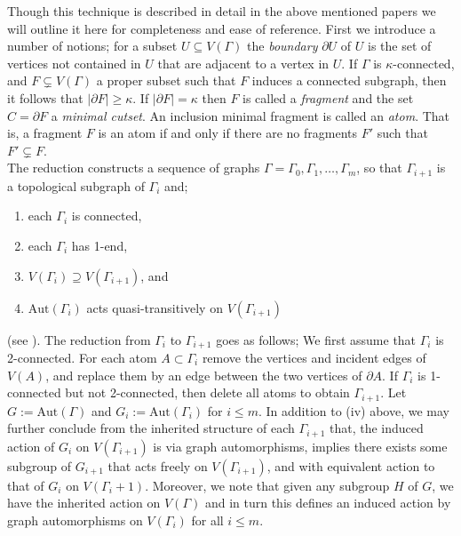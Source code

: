 \documentclass{article}
\numberwithin{equation}{section}
\theoremstyle{definition}
\theoremstyle{remark}
\begin{document}
Though this technique is described in detail in the above mentioned papers we will outline it here for completeness and ease of reference.
First we introduce a number of notions; for a subset $U\subseteq V(\Gamma)$ the \textit{boundary} $\partial U$ of $U$ is the set of vertices not contained in $U$ that are adjacent to a vertex in $U$. If $\Gamma$ is $\kappa$-connected, and $F\subsetneq V(\Gamma)$ a proper subset such that $F$ induces a connected subgraph, then it follows that $|\partial F|\geq \kappa$. If $|\partial F|=\kappa$ then $F$ is called a \textit{fragment} and the set $C=\partial F$ a \textit{minimal cutset}. An inclusion minimal fragment is called an \textit{atom}. That is, a fragment $F$ is an atom if and only if there are no fragments $F'$ such that $F'\subsetneq F.$ 
\\ 
The reduction constructs a sequence of graphs $\Gamma=\Gamma_0,\Gamma_1,\ldots, \Gamma_m$, so that $\Gamma_{i+1}$ is a topological subgraph of $\Gamma_i$ and; 
\begin{enumerate}
    \item each $\Gamma_i$ is connected,
    \item each $\Gamma_i$ has 1-end,
    \item $V(\Gamma_i)\supseteq V(\Gamma_{i+1})$, and
    \item $\text{Aut}(\Gamma_i)$ acts quasi-transitively on $V(\Gamma_{i+1})$
\end{enumerate}
(see \cite[Theorem 4.1]{Babai97}). The reduction from $\Gamma_i$ to $\Gamma_{i+1}$ goes as follows; We first assume that $\Gamma_i$ is 2-connected.
For each atom $A\subset \Gamma_i$ remove the vertices and incident edges of $V(A)$, and replace them by an edge between the two vertices of $\partial A$. If $\Gamma_i$ is 1-connected but not 2-connected, then delete all atoms to obtain $\Gamma_{i+1}$. Let $G:=\text{Aut}(\Gamma)$ and $G_i:=\text{Aut}(\Gamma_i)$ for $i\leq m$.
In addition to (iv) above, we may further conclude from the inherited structure of each $\Gamma_{i+1}$ that, the induced action of $G_i$ on $V(\Gamma_{i+1})$ is via graph automorphisms, implies there exists some subgroup of $G_{i+1}$ that acts freely on $V(\Gamma_{i+1})$, and with equivalent action to that of $G_i$ on $V(\Gamma_i+1)$.
Moreover, we note that given any subgroup $H$ of $G$, we have the inherited action on $V(\Gamma)$ and in turn this defines an induced action by graph automorphisms on $V(\Gamma_i)$ for all $i\leq m$.
\end{document}
